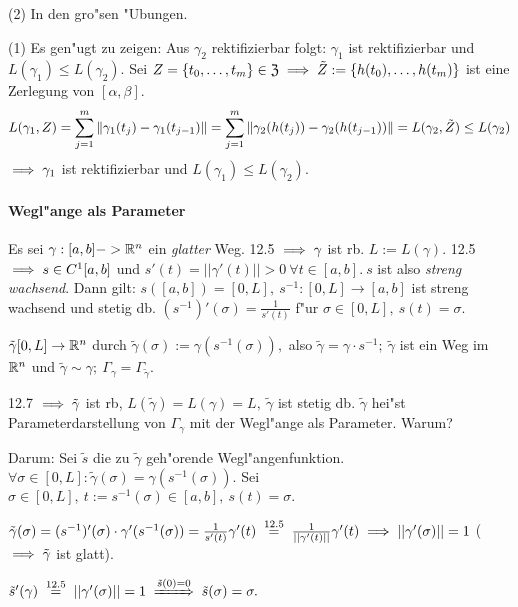 \documentclass[a4paper,twoside,DIV15,BCOR12mm,chapterprefix=true,headings=twolinechapter]{scrbook}
\begin{document}
\begin{beweise}
\item[(2)] In den gro"sen "Ubungen.
\item[(1)] Es gen"ugt zu zeigen: Aus $\gamma_2$ rektifizierbar folgt: $\gamma_1$ ist rektifizierbar und $L(\gamma_1)\le L(\gamma_2)$. Sei $Z=\{t_0,\ldots,t_m\}\in\mathfrak{Z}\implies\tilde{Z}:=\{h(t_0),\ldots, h(t_m)\}$ ist eine Zerlegung von $[\alpha,\beta]$.
$$L(\gamma_1, Z)=\displaystyle\sum_{j=1}^m\|\gamma_1(t_j)-\gamma_1(t_{j-1})\|=\displaystyle\sum_{j=1}^m\|\gamma_2(h(t_j))-\gamma_2(h(t_{j-1}))\|=L(\gamma_2, \tilde{Z})\le L(\gamma_2)$$
$\implies \gamma_1$ ist rektifizierbar und $L(\gamma_1)\le L(\gamma_2)$.
\end{beweise}

\paragraph{Wegl"ange als Parameter}
Es sei $\gamma:[a,b]->\mathbb{R}^n$ ein \emph{glatter} Weg. 12.5 $\implies \gamma$ ist rb. $L:=L(\gamma)$. 12.5 $\implies s \in C^1[a,b]$ und $s'(t) = ||\gamma'(t)|| > 0\ \forall t\in[a,b].\ s$ ist also \emph{streng wachsend}. Dann gilt: $s([a,b]) = [0,L],\ s^{-1}:[0,L]\to[a,b]$ ist streng wachsend und stetig db. $(s^{-1})'(\sigma) = \frac{1}{s'(t)}$ f"ur $\sigma \in [0,L],\ s(t) = \sigma.$

\begin{definition}
$\tilde{\gamma}[0,L] \to \mathbb{R}^n$ durch $\tilde{\gamma}(\sigma) := \gamma(s^{-1}(\sigma)),$ also $\tilde{\gamma} = \gamma\cdot s^{-1};\ \tilde{\gamma}$ ist ein Weg im $\mathbb{R}^n$ und $\tilde{\gamma} \sim \gamma;\ \Gamma_\gamma = \Gamma_{\tilde{\gamma}}.$

12.7 $\implies \tilde{\gamma}$ ist rb, $L(\tilde{\gamma})=L(\gamma)=L,\ \tilde{\gamma}$ ist stetig db. $\tilde{\gamma}$ hei"st Parameterdarstellung von $\Gamma_\gamma$ mit der Wegl"ange als Parameter. Warum?
\end{definition}

Darum: Sei $\tilde{s}$ die zu $\tilde{\gamma}$ geh"orende Wegl"angenfunktion. $\forall \sigma\in[0,L]: \tilde{\gamma}(\sigma) = \gamma(s^{-1}(\sigma)).$ Sei $\sigma\in[0,L],\ t:= s^{-1}(\sigma) \in [a,b],\ s(t) = \sigma.$

$\tilde{\gamma}(\sigma) = (s^{-1})'(\sigma)\cdot\gamma'(s^{-1}(\sigma)) = \frac{1}{s'(t)}\gamma'(t) \gleichnach{12.5} \frac{1}{||\gamma'(t)||}\gamma'(t) \folgt ||\gamma'(\sigma)||=1$ ($\implies \tilde{\gamma}$ ist glatt).

$\tilde{s}'(\gamma) \gleichnach{12.5} ||\gamma'(\sigma)|| = 1 \folgtwegen{\tilde{s}(0)=0} \tilde{s}(\sigma)=\sigma.$
\end{document}
